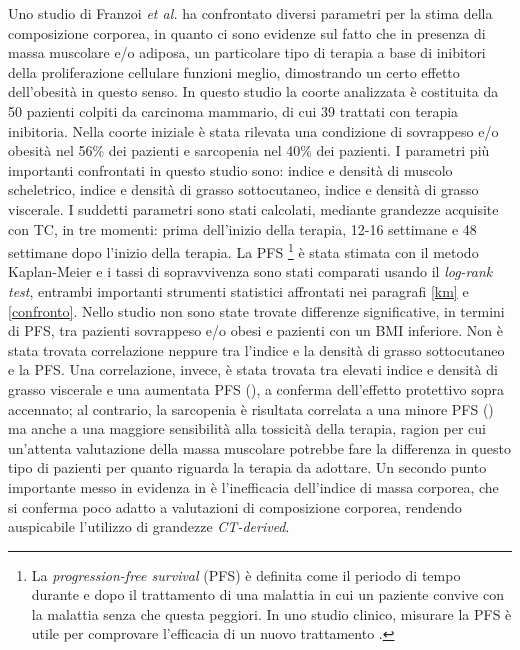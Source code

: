 Uno studio di Franzoi \textit{et al.} \cite{Franzoi2020} ha confrontato diversi parametri per la stima della composizione corporea, in quanto ci sono evidenze sul fatto che in presenza di massa muscolare e/o adiposa, un particolare tipo di terapia a base di inibitori della proliferazione cellulare funzioni meglio, dimostrando un certo effetto  dell'obesità in questo senso. In questo studio la coorte analizzata è costituita da 50 pazienti colpiti da carcinoma mammario, di cui 39 trattati con terapia inibitoria. Nella coorte iniziale è stata rilevata una condizione di sovrappeso e/o obesità nel 56\% dei pazienti e sarcopenia nel 40\% dei pazienti. I parametri più importanti confrontati in questo studio sono: indice e densità di muscolo scheletrico, indice e densità di grasso sottocutaneo, indice e densità di grasso viscerale. I suddetti parametri sono stati calcolati, mediante grandezze acquisite con TC, in tre momenti: prima dell'inizio della terapia, 12-16 settimane e 48 settimane dopo l’inizio della terapia. La PFS%
\footnote{La \textit{progression-free survival} (PFS) è definita come il periodo di tempo durante e dopo il trattamento di una malattia in cui un paziente convive con la malattia senza che questa peggiori. In uno studio clinico, misurare la PFS è utile per comprovare l'efficacia di un nuovo trattamento \cite{pfs}.}
è stata stimata con il metodo Kaplan-Meier e i tassi di sopravvivenza sono stati comparati usando il \textit{log-rank test}, entrambi importanti strumenti statistici affrontati nei paragrafi \ref{km} e \ref{confronto}. Nello studio non sono state trovate differenze significative, in termini di PFS, tra pazienti sovrappeso e/o obesi e pazienti con un BMI inferiore. Non è stata trovata correlazione neppure tra l’indice e la densità di grasso sottocutaneo e la PFS. Una correlazione, invece, è stata trovata tra elevati indice e densità di grasso viscerale e una aumentata PFS (), a conferma dell'effetto protettivo sopra accennato; al contrario, la sarcopenia è risultata correlata a una minore PFS () ma anche a una maggiore sensibilità alla tossicità della terapia, ragion per cui un’attenta valutazione della massa muscolare potrebbe fare la differenza in questo tipo di pazienti per quanto riguarda la terapia da adottare. Un secondo punto importante messo in evidenza in \cite{Franzoi2020} è l’inefficacia dell'indice di massa corporea, che si conferma poco adatto a valutazioni di composizione corporea, rendendo auspicabile l'utilizzo di grandezze \textit{CT-derived}.
